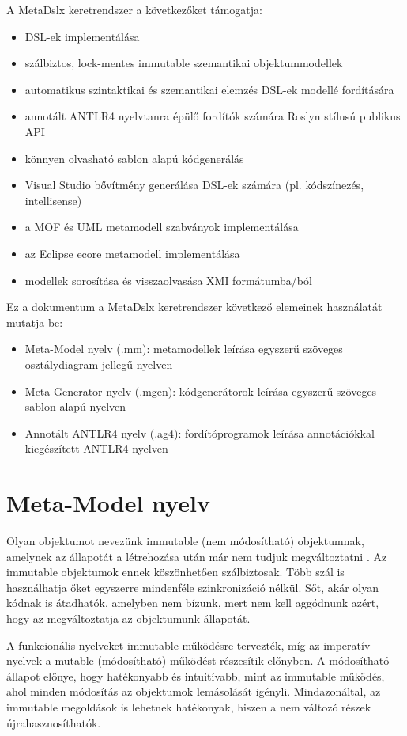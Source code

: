 \documentclass[12pt, a4paper]{report}
\begin{document}
A MetaDslx keretrendszer a következőket támogatja:
\begin{itemize}
	\item DSL-ek implementálása
	\item szálbiztos, lock-mentes immutable szemantikai objektummodellek
	\item automatikus szintaktikai és szemantikai elemzés DSL-ek modellé fordítására
	\item annotált ANTLR4 nyelvtanra épülő fordítók számára Roslyn stílusú publikus API
	\item könnyen olvasható sablon alapú kódgenerálás
	\item Visual Studio bővítmény generálása DSL-ek számára (pl. kódszínezés, intellisense)
	\item a MOF és UML metamodell szabványok implementálása
	\item az Eclipse ecore metamodell implementálása
	\item modellek sorosítása és visszaolvasása XMI formátumba/ból
\end{itemize}

Ez a dokumentum a MetaDslx keretrendszer következő elemeinek használatát mutatja be:
\begin{itemize}
	\item Meta-Model nyelv (.mm): metamodellek leírása egyszerű szöveges osztálydiagram-jellegű nyelven
	\item Meta-Generator nyelv (.mgen): kódgenerátorok leírása egyszerű szöveges sablon alapú nyelven
	\item Annotált ANTLR4 nyelv (.ag4): fordítóprogramok leírása annotációkkal kiegészített ANTLR4 nyelven
\end{itemize}


\chapter{Meta-Model nyelv}

Olyan objektumot nevezünk immutable (nem módosítható) objektumnak, amelynek az állapotát a létrehozása után már nem tudjuk megváltoztatni \cite{Tim05}. Az immutable objektumok ennek köszönhetően szálbiztosak. Több szál is használhatja őket egyszerre mindenféle szinkronizáció nélkül. Sőt, akár olyan kódnak is átadhatók, amelyben nem bízunk, mert nem kell aggódnunk azért, hogy az megváltoztatja az objektumunk állapotát.

A funkcionális nyelveket immutable működésre tervezték, míg az imperatív nyelvek a mutable (módosítható) működést részesítik előnyben. A módosítható állapot előnye, hogy hatékonyabb és intuitívabb, mint az immutable működés, ahol minden módosítás az objektumok lemásolását igényli. Mindazonáltal, az immutable megoldások is lehetnek hatékonyak, hiszen a nem változó részek újrahasznosíthatók.
\end{document}
